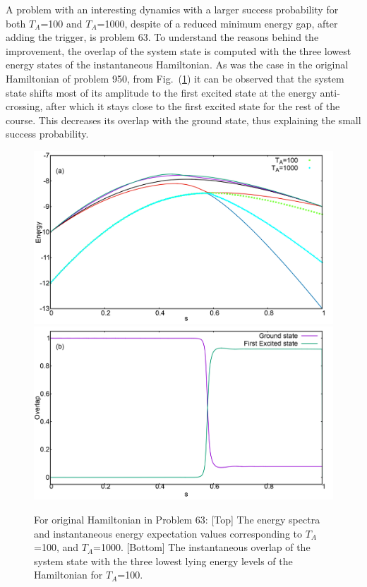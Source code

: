 \documentclass[../main.tex]{subfiles}
\begin{document}
A problem with an interesting dynamics with a larger success probability for both $T_A$=100 and $T_A$=1000, despite of a reduced minimum energy gap, after adding the trigger, is problem 63. To understand the reasons behind the improvement, the overlap of the system state is computed with the three lowest energy states of the instantaneous Hamiltonian. As was the case in the original Hamiltonian of problem 950, from Fig.~(\ref{fig:a52}) it can be observed that the system state shifts most of its amplitude to the first excited state at the energy anti-crossing, after which it stays close to the first excited state for the rest of the course. This decreases its overlap with the ground state, thus explaining the small success probability.
\begin{figure}
\centering
  \includegraphics[scale=0.24]{63_O_g2.png}
  \includegraphics[scale=0.24]{63_Orig_Overlap.png}
  \caption{For original Hamiltonian in Problem 63:  [Top] The energy spectra and instantaneous energy expectation values corresponding to $T_A$=100, and $T_A$=1000. [Bottom] The instantaneous overlap of the system state with the three lowest lying energy levels of the Hamiltonian for $T_A$=100.} 
   \label{fig:a52}
 \end{figure}
\end{document}
